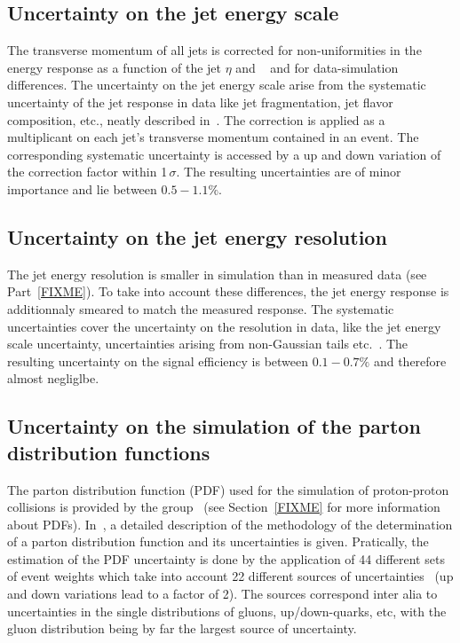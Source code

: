 \subsection*{Uncertainty on the jet energy scale}
The transverse momentum of all jets is corrected for non-uniformities in the energy response as a function of the jet $\eta$ and \pt~\cite{bib:CMS:JME_PAS} and for data-simulation differences.
The uncertainty on the jet energy scale arise from the systematic uncertainty of the jet response in data like jet fragmentation, jet flavor composition, etc., neatly described in~\cite{bib:CMS:JME_PAS}.
The correction is applied as a multiplicant on each jet's transverse momentum contained in an event.
The corresponding systematic uncertainty is accessed by a up and down variation of the correction factor within 1\,$\sigma$.
The resulting uncertainties are of minor importance and lie between $0.5-1.1\%$.

\subsection*{Uncertainty on the jet energy resolution}
The jet energy resolution is smaller in simulation than in measured data (see Part~\ref{FIXME}). 
To take into account these differences, the jet energy response is additionnaly smeared to match the measured response.
The systematic uncertainties cover the uncertainty on the resolution in data, like the jet energy scale uncertainty, uncertainties arising from non-Gaussian tails etc.~\cite{bib:CMS:JME_PAS,bib:Kristin_Thesis}.
The resulting uncertainty on the signal efficiency is between $0.1-0.7\%$ and therefore almost negliglbe.

\subsection*{Uncertainty on the simulation of the parton distribution functions}
The parton distribution function (PDF) used for the simulation of proton-proton collisions is provided by the \cteq group~\cite{Pumplin:2002vw} (see Section~\ref{FIXME} for more information about PDFs).
In~\cite{Pumplin:2002vw}, a detailed description of the methodology of the determination of a parton distribution function and its uncertainties is given.
Pratically, the estimation of the PDF uncertainty is done by the application of 44 different sets of event weights which take into account 22 different sources of uncertainties~\cite{Botje:2011sn,bib:PDF_practical} 
(up and down variations lead to a factor of 2).
The sources correspond inter alia to uncertainties in the single distributions of gluons, up/down-quarks, etc, with the gluon distribution being by far the largest source of uncertainty.

